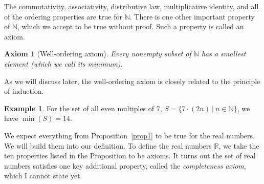 \documentclass[12pt]{amsart}
\newcommand{\R}{{\mathbb{R}}}
\newcommand{\N}{\mathbb{N}}
\numberwithin{equation}{section}
\theoremstyle{plain} %
\newtheorem{axiom}[equation]{Axiom}
\theoremstyle{definition}
\newtheorem{ex}[equation]{Example}
\theoremstyle{remark}
\begin{document}
The commutativity, associativity, distributive law, multiplicative identity, and all of the ordering properties are true for $\N$. There is one other important property of $\N$, which we accept to be true without proof. Such a property is called an axiom.

\begin{axiom}[Well-ordering axiom]
	Every nonempty subset of $\N$ has a smallest element (which we call its minimum).
\end{axiom}

As we will discuss later, the well-ordering axiom is closely related to the principle of induction.

\begin{ex}
	For the set of all even multiples of $7$, $S={\{7 \cdot (2n) \ | \ n\in \N\}}$, we have $\min(S)=14$.
	\end{ex}




We expect everything from Proposition~\ref{prop1} to be true for the real numbers. We will build them into our definition.
To define the real numbers $\R$, we take the ten properties listed in the Proposition to be axioms. 
It turns out the set of real numbers satisfies one key additional
property, called the {\em completeness axiom}, which I cannot state yet. 
\end{document}

